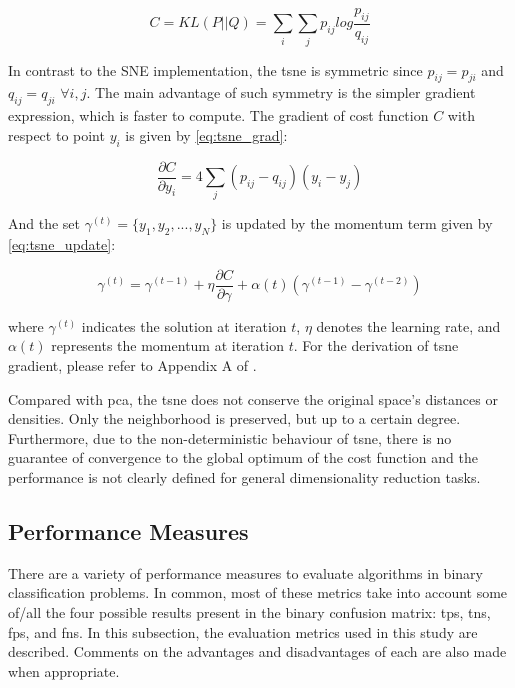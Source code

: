 \begin{equation}
\label{eq:tsne_cost}
C = KL(P||Q) = \sum_i\sum_j p_{ij} log \frac{p_{ij}}{q_{ij}}
\end{equation}

In contrast to the SNE implementation, the \acs{tsne} is symmetric since $p_{ij} = p_{ji}$ and $q_{ij} = q_{ji}$ $\forall i,j$. The main advantage of such symmetry is the simpler gradient expression, which is faster to compute. The gradient of cost function $C$ with respect to point $y_i$ is given by \autoref{eq:tsne_grad}:

\begin{equation}
\label{eq:tsne_grad}
\frac{\partial C}{\partial y_i} = 4 \sum_j (p_{ij} - q_{ij})(y_i - y_j)
\end{equation}

And the set $\gamma^{(t)} = \{y_1, y_2, ..., y_N\}$ is updated by the momentum term given by \autoref{eq:tsne_update}:

\begin{equation}
\label{eq:tsne_update}
\gamma^{(t)} = \gamma^{(t-1)} + \eta\frac{\partial C}{\partial \gamma} + \alpha(t)(\gamma^{(t-1)} - \gamma^{(t-2)})
\end{equation}

\noindent
where $\gamma^{(t)}$ indicates the solution at iteration $t$, $\eta$ denotes the learning rate, and $\alpha(t)$ represents the momentum at iteration $t$. For the derivation of \acs{tsne} gradient, please refer to Appendix A of \citep{tsne}. 

Compared with \acs{pca}, the \acs{tsne} does not conserve the original space's distances or densities. Only the neighborhood is preserved, but up to a certain degree. Furthermore, due to the non-deterministic behaviour of \acs{tsne}, there is no guarantee of convergence to the global optimum of the cost function and the performance is not clearly defined for general dimensionality reduction tasks.  

\subsection{Performance Measures} \label{sec:measures}

There are a variety of performance measures to evaluate algorithms in binary classification problems. In common, most of these metrics take into account some of/all the four possible results present in the binary confusion matrix: \acfp{tp}, \acfp{tn}, \acfp{fp}, and \acfp{fn}. In this subsection, the evaluation metrics used in this study are described. Comments on the advantages and disadvantages of each are also made when appropriate. 

